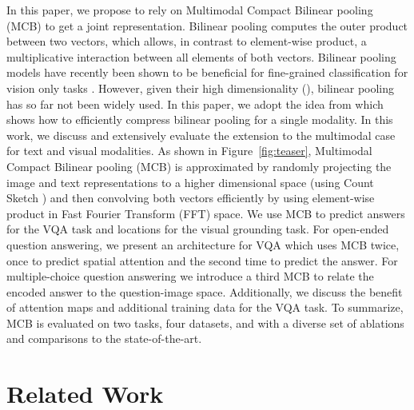 \documentclass[11pt,letterpaper]{article}
\DeclareRobustCommand{\Figref}[1]{Figure~\ref{#1}}
\begin{document}
In this paper, we propose to rely on Multimodal Compact Bilinear pooling (MCB)   to get a joint representation. Bilinear pooling  computes the outer product between two vectors, which allows, in contrast to element-wise product, a multiplicative interaction between all elements of both vectors. Bilinear pooling models \cite{tenenbaum00nc} have  recently been shown to be beneficial for fine-grained classification  for vision only tasks \cite{lin15iccv}. However, given their high dimensionality (), bilinear pooling has so far not been widely used. In this paper, we adopt the idea from  which shows how to efficiently compress bilinear pooling for a single modality.
In this work, we discuss and extensively evaluate the extension to the multimodal case for text and visual modalities.
As shown in  \Figref{fig:teaser},  Multimodal Compact  Bilinear pooling (MCB) is approximated by randomly projecting the image and text representations to a higher dimensional space (using Count Sketch \cite{charikar2002countsketch}) and then convolving both vectors efficiently by using element-wise product in Fast Fourier Transform (FFT) space.
We use MCB to predict answers for the VQA task and locations for the visual grounding task. For open-ended question answering, we present an architecture for VQA which uses MCB twice, once to predict spatial attention and the second time to predict the answer. For multiple-choice question answering we introduce a third MCB to relate the encoded answer to the question-image space.
Additionally, we discuss the benefit of attention maps and additional training data for the VQA task.
To summarize, MCB is evaluated on two tasks, four datasets, and with a diverse set of ablations and comparisons to the state-of-the-art.
 
\section{Related Work}
\end{document}
